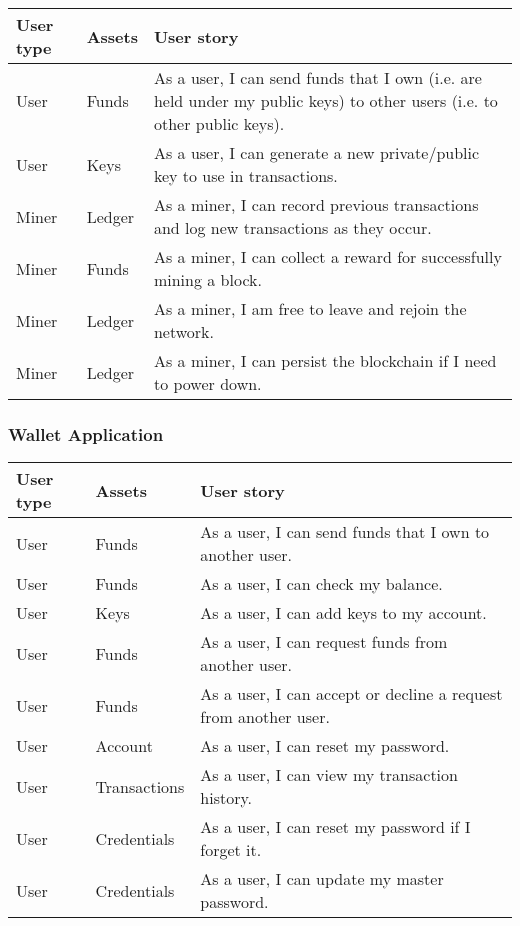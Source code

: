\documentclass[12pt]{article}
\begin{document}
\begin{tabularx}{\linewidth}{|l|l|X|}
\hline
\textbf{User type} & \textbf{Assets} & \textbf{User story} \\
\hline
User & Funds & As a user, I can send funds that I own (i.e. are held under my public keys) to other users (i.e. to other public keys). \\
\hline
User & Keys & As a user, I can generate a new private/public key to use in transactions. \\
\hline
Miner & Ledger & As a miner, I can record previous transactions and log new transactions as they occur. \\
\hline
Miner & Funds & As a miner, I can collect a reward for successfully mining a block. \\
\hline
Miner & Ledger & As a miner, I am free to leave and rejoin the network. \\
\hline
Miner & Ledger & As a miner, I can persist the blockchain if I need to power down. \\
\hline
\end{tabularx}

\subsubsection*{Wallet Application}

\begin{tabularx}{\linewidth}{|l|l|X|}
\hline
\textbf{User type} & \textbf{Assets} & \textbf{User story} \\
\hline
User & Funds & As a user, I can send funds that I own to another user. \\
\hline
User & Funds & As a user, I can check my balance. \\
\hline
User & Keys & As a user, I can add keys to my account. \\
\hline
User & Funds & As a user, I can request funds from another user. \\
\hline
User & Funds & As a user, I can accept or decline a request from another user. \\
\hline
User & Account & As a user, I can reset my password. \\
\hline
User & Transactions & As a user, I can view my transaction history. \\
\hline
User & Credentials & As a user, I can reset my password if I forget it. \\
\hline
User & Credentials & As a user, I can update my master password. \\
\hline
\end{tabularx}
\end{document}
